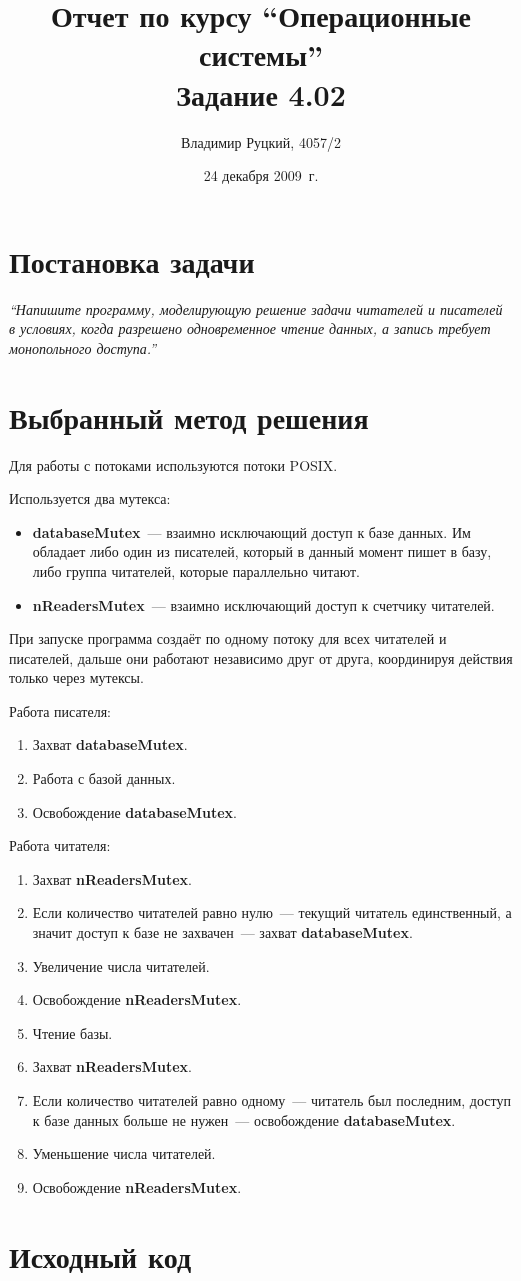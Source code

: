 \documentclass[a4paper,12pt]{article}
\title{Отчет по курсу ``Операционные системы'' \\ Задание 4.02}
\author{Владимир Руцкий, 4057/2}
\date{24 декабря 2009~г.}
\newcommand{\varquote}[1]{\textbf{#1}}
\begin{document}
\maketitle

\section*{Постановка задачи}
\textit{``Напишите программу, моделирующую решение задачи читателей и писателей в
условиях, когда разрешено одновременное чтение данных, а запись требует
монопольного доступа.''}

\section*{Выбранный метод решения}
Для работы с потоками используются потоки POSIX.

Используется два мутекса:
\begin{itemize}
 \item \varquote{databaseMutex}~--- взаимно исключающий доступ к базе данных.
Им обладает либо один из писателей, который в данный момент пишет в базу, 
либо группа читателей, которые параллельно читают.
 \item \varquote{nReadersMutex}~--- взаимно исключающий доступ к счетчику читателей.
\end{itemize}

При запуске программа создаёт по одному потоку для всех читателей и писателей,
дальше они работают независимо друг от друга, координируя действия только через мутексы.

Работа писателя:
\begin{enumerate}
 \item Захват \varquote{databaseMutex}.
 \item Работа с базой данных.
 \item Освобождение \varquote{databaseMutex}.
\end{enumerate}

Работа читателя:
\begin{enumerate}
 \item Захват \varquote{nReadersMutex}.
 \item Если количество читателей равно нулю~--- текущий читатель единственный, 
а значит доступ к базе не захвачен~--- захват \varquote{databaseMutex}.
 \item Увеличение числа читателей.
 \item Освобождение \varquote{nReadersMutex}.
 \item Чтение базы.
 \item Захват \varquote{nReadersMutex}.
 \item Если количество читателей равно одному~--- читатель был последним, 
доступ к базе данных больше не нужен~--- освобождение \varquote{databaseMutex}.
 \item Уменьшение числа читателей.
 \item Освобождение \varquote{nReadersMutex}.
\end{enumerate}

\section*{Исходный код}
\lstset{language=C, caption=task\_4\_02.c,%
label=source-code, basicstyle=\footnotesize,%
numbers=left, numberstyle=\footnotesize, numbersep=5pt, frame=single, breaklines=true, breakatwhitespace=false,%
inputencoding=utf8x}

\end{document}
